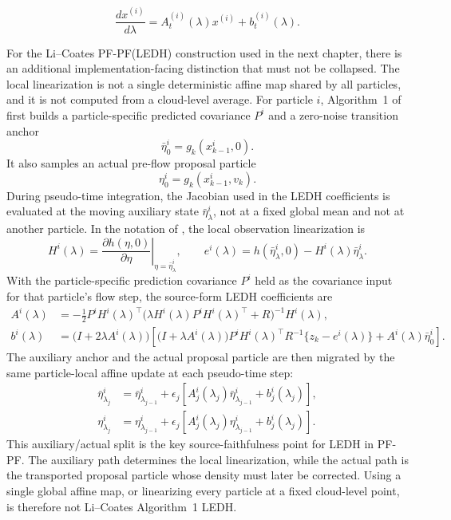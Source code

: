 \begin{equation}
\label{eq:bf-pff-ledh-ode}
  \frac{dx^{(i)}}{d\lambda}
  = A_t^{(i)}(\lambda)x^{(i)} + b_t^{(i)}(\lambda).
\end{equation}

For the Li--Coates PF-PF(LEDH) construction used in the next chapter,
there is an additional implementation-facing distinction that must not be
collapsed.  The local linearization is not a single deterministic affine map
shared by all particles, and it is not computed from a cloud-level average.
For particle $i$, Algorithm~1 of \citet{li2017particle} first builds a
particle-specific predicted covariance $P^i$ and a zero-noise transition anchor
\[
  \bar\eta_0^i = g_k(x_{k-1}^i,0).
\]
It also samples an actual pre-flow proposal particle
\[
  \eta_0^i = g_k(x_{k-1}^i,v_k).
\]
During pseudo-time integration, the Jacobian used in the LEDH coefficients is
evaluated at the moving auxiliary state $\bar\eta^i_\lambda$, not at a fixed
global mean and not at another particle.  In the notation of
\citet{li2017particle}, the local observation linearization is
\begin{equation}
\label{eq:bf-pff-li-coates-local-jacobian}
  H^i(\lambda)
  =
  \left.
  \frac{\partial h(\eta,0)}{\partial \eta}
  \right|_{\eta=\bar\eta^i_\lambda},
  \qquad
  e^i(\lambda)
  =
  h(\bar\eta^i_\lambda,0)-H^i(\lambda)\bar\eta^i_\lambda .
\end{equation}
With the particle-specific prediction covariance $P^i$ held as the covariance
input for that particle's flow step, the source-form LEDH coefficients are
\begin{align}
\label{eq:bf-pff-li-coates-ledh-A}
  A^i(\lambda)
  &=
  -\frac{1}{2}
  P^i H^i(\lambda)^\top
  \bigl(\lambda H^i(\lambda)P^iH^i(\lambda)^\top+R\bigr)^{-1}
  H^i(\lambda), \\
\label{eq:bf-pff-li-coates-ledh-b}
  b^i(\lambda)
  &=
  \bigl(I+2\lambda A^i(\lambda)\bigr)
  \left[
    \bigl(I+\lambda A^i(\lambda)\bigr)
    P^i H^i(\lambda)^\top R^{-1}\{z_k-e^i(\lambda)\}
    + A^i(\lambda)\bar\eta_0^i
  \right].
\end{align}
The auxiliary anchor and the actual proposal particle are then migrated by the
same particle-local affine update at each pseudo-time step:
\begin{align}
\label{eq:bf-pff-li-coates-aux-update}
  \bar\eta^i_{\lambda_j}
  &=
  \bar\eta^i_{\lambda_{j-1}}
  +\epsilon_j
  \left[
    A_j^i(\lambda_j)\bar\eta^i_{\lambda_{j-1}}
    +b_j^i(\lambda_j)
  \right],\\
\label{eq:bf-pff-li-coates-actual-update}
  \eta^i_{\lambda_j}
  &=
  \eta^i_{\lambda_{j-1}}
  +\epsilon_j
  \left[
    A_j^i(\lambda_j)\eta^i_{\lambda_{j-1}}
    +b_j^i(\lambda_j)
  \right].
\end{align}
This auxiliary/actual split is the key source-faithfulness point for LEDH in
PF-PF.  The auxiliary path determines the local linearization, while the actual
path is the transported proposal particle whose density must later be corrected.
Using a single global affine map, or linearizing every particle at a fixed
cloud-level point, is therefore not Li--Coates Algorithm~1 LEDH.


